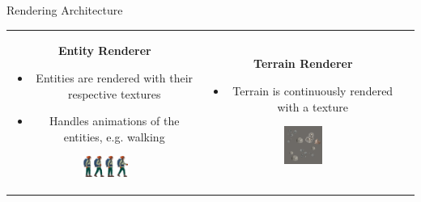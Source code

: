 \begin{frame}{Rendering Architecture}
    \begin{tabular}{ccc}

        \parbox{0.3\textwidth}{
            \centering \textbf{Entity Renderer}
            \vspace{0.2cm}
            \begin{itemize}
                \item Entities are rendered with their respective textures
                \item Handles animations of the entities, e.g. walking
            \end{itemize}
            \vspace{0.5cm}
            \centering
            \includegraphics[width=0.25\textwidth]{../../assets/texture/player_walk.png}
        } &

        \pause
        
        \parbox{0.3\textwidth}{
            \centering \textbf{Terrain Renderer}
            \vspace{0.2cm}
            \begin{itemize}
                \item Terrain is continuously rendered with a texture
            \end{itemize}
            \vspace{0.5cm}
            \centering
            \includegraphics[width=0.2\textwidth]{../../assets/layers/mountain3.png}
        } &

        \pause
        

\end{tabular}
\end{frame}
